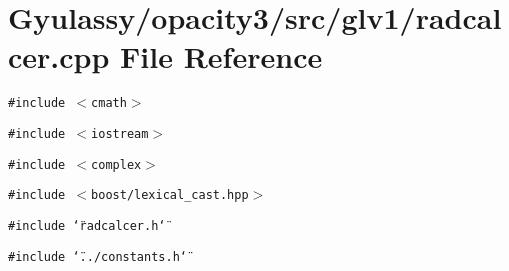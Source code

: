\section{Gyulassy/opacity3/src/glv1/radcalcer.cpp File Reference}
\label{radcalcer_8cpp}
{\tt \#include $<$cmath$>$}\par
{\tt \#include $<$iostream$>$}\par
{\tt \#include $<$complex$>$}\par
{\tt \#include $<$boost/lexical\_\-cast.hpp$>$}\par
{\tt \#include \char`\"{}radcalcer.h\char`\"{}}\par
{\tt \#include \char`\"{}../constants.h\char`\"{}}\par
